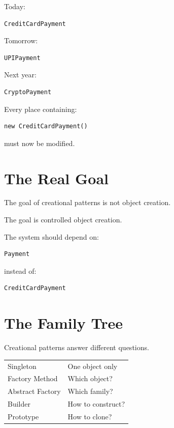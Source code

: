 \documentclass[11pt,a4paper]{book}
\begin{document}
Today:

\begin{verbatim}
CreditCardPayment
\end{verbatim}

Tomorrow:

\begin{verbatim}
UPIPayment
\end{verbatim}

Next year:

\begin{verbatim}
CryptoPayment
\end{verbatim}

Every place containing:

\begin{verbatim}
new CreditCardPayment()
\end{verbatim}

must now be modified.


\section{The Real Goal}

\begin{idea}

The goal of creational patterns is not object creation.

The goal is controlled object creation.

\end{idea}

The system should depend on:

\begin{verbatim}
Payment
\end{verbatim}

instead of:

\begin{verbatim}
CreditCardPayment
\end{verbatim}


\section{The Family Tree}

Creational patterns answer different questions.

\begin{center}

\begin{tabular}{ll}
Singleton & One object only \\
Factory Method & Which object? \\
Abstract Factory & Which family? \\
Builder & How to construct? \\
Prototype & How to clone? \\
\end{tabular}

\end{center}
\end{document}
